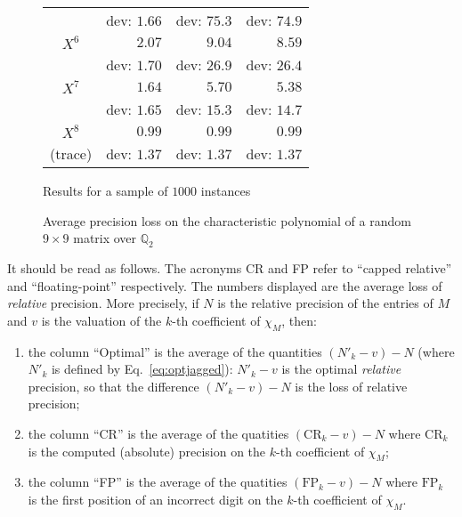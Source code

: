 \documentclass{sig-alternate-05-2015}
\newcommand{\Q}{\mathbb Q}
\begin{document}
\begin{figure}
{\begin{tabular}{|c|r|r|r|}
& {\scriptsize dev: $1.66$} & {\scriptsize dev: $75.3$} & {\scriptsize dev: $74.9$} \\
\rule{0pt}{2.7ex}%
$X^6$ & $2.07$ &   $9.04$           &   $8.59$ \vspace{-1.5ex} \\
& {\scriptsize dev: $1.70$} & {\scriptsize dev: $26.9$} & {\scriptsize dev: $26.4$} \\
\rule{0pt}{2.7ex}%
$X^7$ & $1.64$ &   $5.70$           &   $5.38$ \vspace{-1.5ex} \\
& {\scriptsize dev: $1.65$} & {\scriptsize dev: $15.3$} & {\scriptsize dev: $14.7$} \\
\rule{0pt}{2.7ex}%
$X^8$ & $0.99$ &   $0.99$           &   $0.99$ \vspace{-1.5ex} \\
{\scriptsize (trace)} 
& {\scriptsize dev: $1.37$} & {\scriptsize dev: $1.37$} & {\scriptsize dev: $1.37$} \\
\hline
\end{tabular}}
\hfill\null

\medskip

\hfill
{\footnotesize Results for a sample of $1000$ instances}
\hfill\null

\caption{Average precision loss on 
the characteristic polynomial of a random $9 \times 9$
matrix over $\Q_2$}
\label{fig:exp}

\end{figure}
%
It should be read as follows. The acronyms CR and FP 
refer to ``capped relative'' and ``floating-point'' respectively.
The numbers displayed are the average loss of
\emph{relative} precision. 
More precisely, if $N$ is the relative precision of
the entries of $M$ and $v$ is the valuation of
the $k$-th coefficient of $\chi_M$, then:

\vspace{-2mm}

\begin{enumerate}[$\bullet$]
\renewcommand{\itemsep}{0pt}
\item the column ``Optimal'' is the average of the quantities 
$(N'_k{-}v) - N$ (where $N'_k$ is defined by Eq.~\eqref{eq:optjagged}): 
$N'_k{-}v$ is the optimal \emph{relative} precision, so that the
difference $(N'_k{-}v) - N$ is the loss of relative precision;
\item the column ``CR'' is the average of the quatities 
$(\text{CR}_k{-}v) - N$ where $\text{CR}_k$ is the computed (absolute) 
precision on the $k$-th coefficient of $\chi_M$;
\item the column ``FP'' is the average of the quatities 
$(\text{FP}_k{-}v) - N$ where $\text{FP}_k$ is the first position of
an incorrect digit on the $k$-th coefficient of $\chi_M$.
\end{enumerate}
\end{document}

